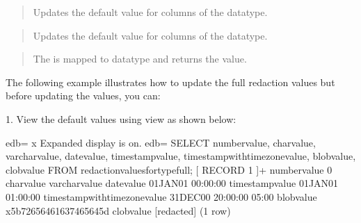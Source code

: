 \documentclass[letterpaper,10pt,english,openany,oneside]{sphinxmanual}
\begin{document}
\newpage

\begin{quote}

Updates the default value for columns of the  datatype.
\end{quote}

\begin{quote}

Updates the default value for columns of the  datatype.
\end{quote}

\begin{quote}

The  is mapped to  datatype and returns the  value.
\end{quote}


The following example illustrates how to update the full redaction
values but before updating the values, you can:

1. View the default values using  view
as shown below:

%
\begin{sphinxVerbatim}[commandchars=\\\{\}]
edb=\PYGZsh{} \PYGZbs{}x
Expanded display is on.
edb=\PYGZsh{} SELECT number\PYGZus{}value, char\PYGZus{}value, varchar\PYGZus{}value, date\PYGZus{}value,
       timestamp\PYGZus{}value, timestamp\PYGZus{}with\PYGZus{}time\PYGZus{}zone\PYGZus{}value, blob\PYGZus{}value, clob\PYGZus{}value
FROM redaction\PYGZus{}values\PYGZus{}for\PYGZus{}type\PYGZus{}full;
\PYGZhy{}[ RECORD 1 ]\PYGZhy{}\PYGZhy{}\PYGZhy{}\PYGZhy{}\PYGZhy{}\PYGZhy{}\PYGZhy{}\PYGZhy{}\PYGZhy{}\PYGZhy{}\PYGZhy{}\PYGZhy{}\PYGZhy{}\PYGZhy{}\PYGZhy{}\PYGZhy{}\PYGZhy{}\PYGZhy{}+\PYGZhy{}\PYGZhy{}\PYGZhy{}\PYGZhy{}\PYGZhy{}\PYGZhy{}\PYGZhy{}\PYGZhy{}\PYGZhy{}\PYGZhy{}\PYGZhy{}\PYGZhy{}\PYGZhy{}\PYGZhy{}\PYGZhy{}\PYGZhy{}\PYGZhy{}\PYGZhy{}\PYGZhy{}\PYGZhy{}\PYGZhy{}\PYGZhy{}\PYGZhy{}\PYGZhy{}\PYGZhy{}\PYGZhy{}
number\PYGZus{}value                   \textbar{} 0
char\PYGZus{}value                     \textbar{}
varchar\PYGZus{}value                  \textbar{}
date\PYGZus{}value                     \textbar{} 01\PYGZhy{}JAN\PYGZhy{}01 00:00:00
timestamp\PYGZus{}value                \textbar{} 01\PYGZhy{}JAN\PYGZhy{}01 01:00:00
timestamp\PYGZus{}with\PYGZus{}time\PYGZus{}zone\PYGZus{}value \textbar{} 31\PYGZhy{}DEC\PYGZhy{}00 20:00:00 \PYGZhy{}05:00
blob\PYGZus{}value                     \textbar{} \PYGZbs{}x5b72656461637465645d
clob\PYGZus{}value                     \textbar{} [redacted]
(1 row)
\end{sphinxVerbatim}
\end{document}
